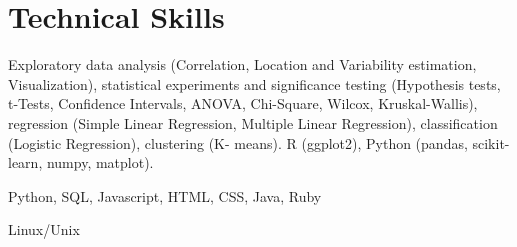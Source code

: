 
\section{Technical Skills}

 Exploratory data analysis (Correlation, Location and Variability estimation, Visualization), statistical experiments and significance testing (Hypothesis tests, t-Tests, Confidence Intervals, ANOVA, Chi-Square, Wilcox, Kruskal-Wallis), regression (Simple Linear Regression, Multiple Linear Regression), classification (Logistic Regression), clustering (K- means). R (ggplot2), Python (pandas, scikit-learn, numpy, matplot).



 Python, SQL, Javascript, HTML, CSS, Java, Ruby


 Linux/Unix
